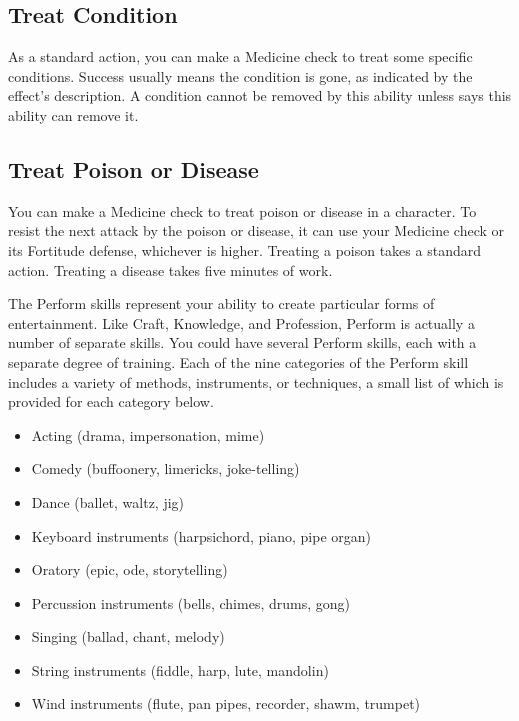     \subsection{Treat Condition}\label{Treat Condition}
        As a standard action, you can make a Medicine check to treat some specific conditions.
        Success usually means the condition is gone, as indicated by the effect's description.
        A condition cannot be removed by this ability unless says this ability can remove it.

    \subsection{Treat Poison or Disease}
        You can make a Medicine check to treat poison or disease in a character.
        To resist the next attack by the poison or disease, it can use your Medicine check or its Fortitude defense, whichever is higher.
        Treating a poison takes a standard action. Treating a disease takes five minutes of work.

\newpage
{}
    The Perform skills represent your ability to create particular forms of entertainment.
        Like Craft, Knowledge, and Profession, Perform is actually a number of separate skills.
        You could have several Perform skills, each with a separate degree of training.
        Each of the nine categories of the Perform skill includes a variety of methods, instruments, or techniques, a small list of which is provided for each category below.

        \begin{itemize}
            \item Acting (drama, impersonation, mime)
            \item Comedy (buffoonery, limericks, joke-telling)
            \item Dance (ballet, waltz, jig)
            \item Keyboard instruments (harpsichord, piano, pipe organ)
            \item Oratory (epic, ode, storytelling)
            \item Percussion instruments (bells, chimes, drums, gong)
            \item Singing (ballad, chant, melody)
            \item String instruments (fiddle, harp, lute, mandolin)
            \item Wind instruments (flute, pan pipes, recorder, shawm, trumpet)
        \end{itemize}

